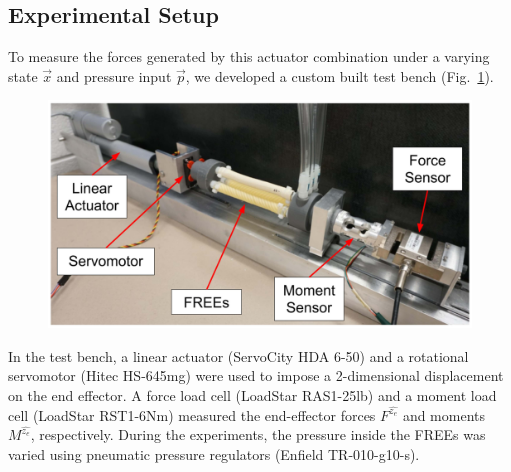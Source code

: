 \subsection{Experimental Setup}
To measure the forces generated by this actuator combination under a varying state $\vec{x}$ and pressure input $\vec{p}$, we developed a custom built test bench (Fig.~\ref{fig:rig}). 
%
\begin{figure}
    \centering
    \includegraphics[width=\linewidth]{figures/photos/rig_labeled2.jpg}
    \caption{}
    \label{fig:rig}
\end{figure}
%
In the test bench, a linear actuator (ServoCity HDA 6-50) and a rotational servomotor (Hitec HS-645mg) were used to impose a 2-dimensional displacement on the end effector. 
A force load cell (LoadStar  RAS1-25lb) and a moment load cell (LoadStar RST1-6Nm) measured the end-effector forces $F^{\hat{z_e}}$ and moments $M^{\hat{z_e}}$, respectively.
During the experiments, the pressure inside the FREEs was varied using pneumatic pressure regulators (Enfield TR-010-g10-s). 

